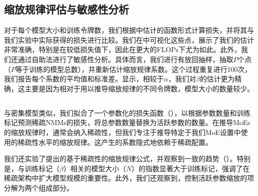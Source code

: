 \subsection{缩放规律评估与敏感性分析}

对于每个模型大小和训练令牌数，我们根据中估计的函数形式计算损失，并将其与我们实验中实际获得的损失进行比较。我们在中可视化这些点，展示了我们的估计非常准确，特别是在较低损失值下，因此在更大的FLOPs下尤为如此。此外，我们还通过自助法进行了敏感性分析。具体而言，我们进行有放回抽样，抽取\( P \)个点（\( P \)等于训练的模型总数），并重新估计缩放规律系数。这个过程重复进行100次，我们报告每个系数的平均值和标准差。显示，相较于\(\alpha\)，我们对\(\beta\)的估计更为精确，这主要是因为相对于用以推导缩放规律的不同令牌数，模型大小的数量较少。

\begin{table}[htb]
    \centering
    \setlength{\tabcolsep}{16pt}
    \renewcommand{\arraystretch}{1}
    \caption{\textbf{缩放规律的敏感性。} 我们报告了经过 100 次迭代的自助法后的均值和标准差。}
    \label{tab:scaling_laws_sensitivity}
\end{table}
\subsection{}
\label{app:scaling_laws_moes}

与密集模型类似，我们拟合了一个参数化的损失函数（），以根据参数数量和训练标记预测稀疏NMMs的损失，将总参数数量替换为活跃参数的数量。在推导MoEs的缩放规律时，通常会纳入稀疏性\citep{wangscalingmoe,krajewski2024scalingmoe,abnar2025parameters}，但我们专注于推导特定于我们MoE设置中使用的稀疏性水平的缩放规律。这产生的系数隐式地依赖于稀疏配置。

我们还实验了\citep{abnar2025parameters}提出的基于稀疏性的缩放规律公式，并观察到一致的趋势（）。特别是，与训练标记（$\beta$）相关的模型大小（$N$）的指数显著大于训练标记，强调了在稀疏架构中扩大模型规模的重要性。此外，我们还观察到，控制活跃参数缩放的项分解为两个组成部分。

